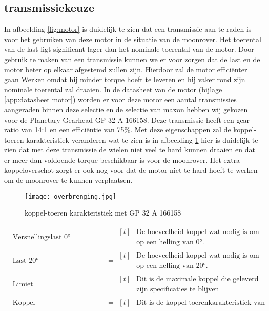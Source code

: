 \newpage

\subsection{transmissiekeuze}
In afbeelding \ref{fig:motor} is duidelijk te zien dat een transmissie aan te raden is voor het gebruiken van deze motor in de situatie van de moonrover. Het toerental van de last ligt significant lager dan het nominale toerental van de motor. Door gebruik te maken van een transmissie kunnen we er voor zorgen dat de last en de motor beter op elkaar afgestemd zullen zijn. Hierdoor zal de motor efficiënter gaan Werken omdat hij minder torque hoeft te leveren en hij vaker rond zijn nominale toerental zal draaien. In de datasheet van de  motor (bijlage \ref{app:datasheet motor}) worden er voor deze motor een aantal transmissies aangeraden binnen deze selectie en de selectie van maxon hebben wij gekozen voor de Planetary Gearhead GP 32 A 166158. Deze transmissie heeft een gear ratio van 14:1 en een efficiëntie van 75\%. Met deze eigenschappen zal de koppel-toeren karakteristiek veranderen wat te zien is in afbeelding \ref{fig:GP 32 A 166158} hier is duidelijk te zien dat met deze transmissie de wielen niet veel te hard kunnen draaien en dat er meer dan voldoende torque beschikbaar is voor de moonrover. Het extra koppeloverschot zorgt er ook nog voor dat de motor niet te hard hoeft te werken om de moonrover te kunnen verplaatsen.

        \begin{figure}[H]
                \centering
                \texttt{[image: overbrenging.jpg]}
                \caption{koppel-toeren karakteristiek met GP 32 A 166158}
                \label{fig:GP 32 A 166158}
        \end{figure}

        \begin{align*}
                & \text{Versnellingslast 0°} &&= \begin{aligned}[t] & \text{De hoeveelheid koppel wat nodig is om maximaal te versnellen} \\ & \text{op een helling van 0°.} \end{aligned}\\
                & \text{Last 20°} &&= \begin{aligned}[t] & \text{De hoeveelheid koppel wat nodig is om stil te blijven staan} \\ & \text{op een helling van 20°.} \end{aligned}\\
                & \text{Limiet} &&= \begin{aligned}[t] & \text{Dit is de maximale koppel die geleverd mag worden om binnen}\\ & \text{zijn specificaties te blijven} \end{aligned}\\
                & \text{Koppel-toerenkarakteristiek motor} &&= \begin{aligned}[t] & \text{Dit is de koppel-toerenkarakteristiek van de motor.} \end{aligned}
            \end{align*}


